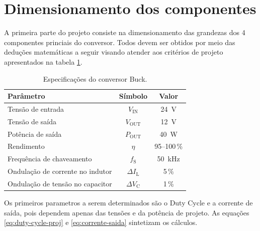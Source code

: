 \section{Dimensionamento dos componentes}

A primeira parte do projeto consiste na dimensionamento das grandezas dos 4 componentes princiais do conversor. Todos devem ser obtidos por meio das deduções matemáticas a seguir visando atender aos critérios de projeto apresentados na tabela \ref{tab:especificacoes-buck}.

\begin{table}[ht]
    \centering
    \caption{Especificações do conversor Buck.}
    \label{tab:especificacoes-buck}
    \begin{tabular}{lcc}
        \toprule
        \textbf{Parâmetro} & \textbf{Símbolo} & \textbf{Valor} \\
        \midrule

        Tensão de entrada
            & $V_{\mathrm{IN}}$
            & \SI{24}{\volt} \\

        Tensão de saída
            & $V_{\mathrm{OUT}}$
            & \SI{12}{\volt} \\

        Potência de saída
            & $P_{\mathrm{OUT}}$
            & \SI{40}{\watt} \\

        Rendimento
            & $\eta$
            & 95--100\,\% \\

        Frequência de chaveamento
            & $f_{\mathrm{S}}$
            & \SI{50}{\kilo\hertz} \\

        Ondulação de corrente no indutor
            & $\Delta I_{\mathrm{L}}$
            & 5\,\% \\

        Ondulação de tensão no capacitor
            & $\Delta V_{\mathrm{C}}$
            & 1\,\% \\

        \bottomrule
    \end{tabular}

\end{table}

Os primeiros parametros a serem determinados são o Duty Cycle e a corrente de saída, pois dependem apenas das tensões e da potência de projeto. As equações \ref{eq:duty-cycle-proj} e \ref{eq:corrente-saida} sintetizam os cálculos.

